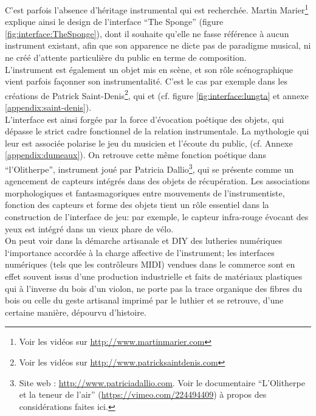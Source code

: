 \noindent C'est parfois l'absence d'héritage instrumental qui est recherchée. Martin Marier\footnote{Voir les vidéos sur \url{http://www.martinmarier.com}} explique ainsi le design de l'interface ``The Sponge'' \cite{marier_sponge_2010} (figure \ref{fig:interface:TheSponge}), dont il souhaite qu'elle ne fasse référence à aucun instrument existant, afin que son apparence ne dicte pas de paradigme musical, ni ne créé d'attente particulière du public en terme de composition.\\
\indent L'instrument est également un objet mis en scène, et son rôle scénographique vient parfois façonner son instrumentalité. C'est le cas par exemple dans les créations de Patrick Saint-Denis\footnote{Voir les vidéos sur \url{http://www.patricksaintdenis.com}}, qui  et  (cf. figure \ref{fig:interface:lungta} et annexe \ref{appendix:saint-denis}).\\
\indent L'interface est ainsi forgée par la force d'évocation poétique des objets, qui dépasse le strict cadre fonctionnel de la relation instrumentale. La mythologie qui leur est associée polarise le jeu du musicien et l'écoute du public,  (cf. Annexe \ref{appendix:dumeaux}). On retrouve cette même fonction poétique dans ``l'Olitherpe'', instrument joué par Patricia Dallio\footnote{Site web : \url{http://www.patriciadallio.com}. Voir le documentaire ``L'Olitherpe et la teneur de l'air'' (\url{https://vimeo.com/224494409}) à propos des considérations faites ici.}, qui se présente comme un agencement de capteurs intégrés dans des objets de récupération. Les associations morphologiques et fantasmagoriques entre mouvements de l'instrumentiste, fonction des capteurs et forme des objets tient un rôle essentiel dans la construction de l'interface de jeu: par exemple, le capteur infra-rouge évocant des yeux est intégré dans un vieux phare de vélo.\\
\indent On peut voir dans la démarche artisanale et \gls{DIY} des lutheries numériques l`importance accordée à la charge affective de l'instrument; les interfaces numériques (tels que les contrôleurs \gls{MIDI}) vendues dans le commerce sont en effet souvent issus d'une production industrielle et faits de matériaux plastiques qui à l'inverse du bois d'un violon, ne porte pas la trace organique des fibres du bois ou celle du geste artisanal imprimé par le luthier et se retrouve, d'une certaine manière, dépourvu d'histoire.

